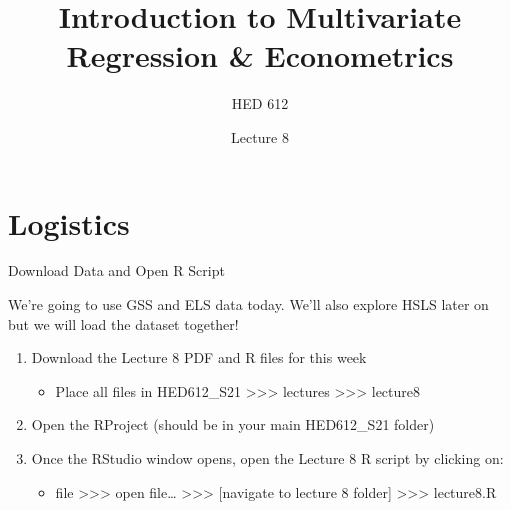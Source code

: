 \documentclass[
  8pt,
  ignorenonframetext,
  dvipsnames]{beamer}
\title{Introduction to Multivariate Regression \& Econometrics}
\subtitle{HED 612}
\author{Lecture 8}
\date{}
\providecommand{\tightlist}{%
  \setlength{\itemsep}{0pt}\setlength{\parskip}{0pt}}
\let\olditem\item
\renewcommand{\item}{%
  \olditem\vspace{4pt}
}
\begin{document}
\frame{\titlepage}

\begin{frame}
  \tableofcontents[hideallsubsections]
\end{frame}
\hypertarget{logistics}{%
\section{Logistics}\label{logistics}}

\begin{frame}{Download Data and Open R Script}
\protect\hypertarget{download-data-and-open-r-script}{}

We're going to use GSS and ELS data today. We'll also explore HSLS later
on but we will load the dataset together!

\medskip

\begin{enumerate}
\tightlist
\item
  Download the Lecture 8 PDF and R files for this week

  \begin{itemize}
  \tightlist
  \item
    Place all files in HED612\_S21
    \textgreater\textgreater\textgreater{} lectures
    \textgreater\textgreater\textgreater{} lecture8
  \end{itemize}
\item
  Open the RProject (should be in your main HED612\_S21 folder)
\item
  Once the RStudio window opens, open the Lecture 8 R script by clicking
  on:

  \begin{itemize}
  \tightlist
  \item
    file \textgreater\textgreater\textgreater{} open file\ldots{}
    \textgreater\textgreater\textgreater{} {[}navigate to lecture 8
    folder{]} \textgreater\textgreater\textgreater{} lecture8.R
  \end{itemize}
\end{enumerate}

\end{frame}
\end{document}
